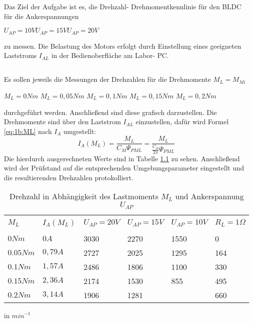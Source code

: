 \chapter{}\label{ch:auf5}
Das Ziel der Aufgabe ist es, die Drehzahl- Drehmomentkennlinie für den BLDC für die Ankerspannungen 
\begin{center}
	$ U_{AP} = 10V $\hspace{1cm}$ U_{AP} = 15V $\hspace{1cm}$ U_{AP} = 20V $\\
\end{center}
zu messen. Die Belastung des Motors erfolgt durch Einstellung eines geeigneten Laststroms $ I_{AL} $ in der Bedienoberfläche am Labor- PC.

\section{}\label{sec:5a}
Es sollen jeweils die Messungen der Drehzahlen für die Drehmomente $ M_{L} = M_{Mi} $
\begin{center}
	$ M_{L} = 0 Nm $ \hspace{0.7cm} $ M_{L} = 0,05 Nm $ \hspace{0.7cm}	$ M_{L} = 0,1 Nm $ \hspace{0.7cm}	$ M_{L} = 0,15 Nm $ \hspace{0.7cm}	$ M_{L} = 0,2 Nm $
\end{center}	
durchgeführt werden. Anschließend sind diese grafisch darzustellen. Die Drehmomente sind über den Laststrom $ I_{AL} $ einzustellen, dafür wird Formel \ref{eq:1b:ML} nach $ I_{A} $ umgestellt:
\begin{equation}
	I_{A}(M_{L}) = \frac{M_{L}}{C_{M}\Psi_{PML}} = \frac{M_{L}}{\frac{C_{E}}{2\pi}\Psi_{PML}}
	\label{eq:5a:IA}
\end{equation}
Die hierdurch ausgerechneten Werte sind in Tabelle \ref{tab:5a:Drehzahlen} zu sehen. Anschließend wird der Prüfstand auf die entsprechenden Umgebungsparameter eingestellt und die resultierenden Drehzahlen protokolliert.
\begin{table}[h]
	\centering
	\begin{tabular}{p{2cm} | p{2cm} | p{2cm} p{2cm} p{2cm} | p{2cm} }
		&&&&&\\[-1em]
		$ M_{L} $ & $ I_{A}(M_{L}) $ & $ U_{AP} = 20V $ & $U_{AP} =  15V $ & $U_{AP} =  10V $ & $ R_{L} = 1\Omega $ \\
		\hline &&&&&\\[-1em]
		$ 0Nm $ & $ 0A $ & 3030 & 2270 & 1550 & 0 \\
		$ 0.05Nm $ & $ 0,79A $ & 2727 & 2025 & 1295 & 164 \\
		$ 0.1Nm $ & $ 1,57A $ & 2486 & 1806 & 1100 & 330 \\
		$ 0.15Nm $ & $ 2,36A $ & 2174 & 1530 & 855 & 495 \\
		$ 0.2Nm $ & $ 3,14A $ & 1906 & 1281 &   & 660
	\end{tabular}
	\caption{Drehzahl in Abhängigkeit des Lastmoments $ M_{L} $ und Ankerspannung $ U_{AP} $} in $ min^{-1} $
	\label{tab:5a:Drehzahlen}
\end{table}

